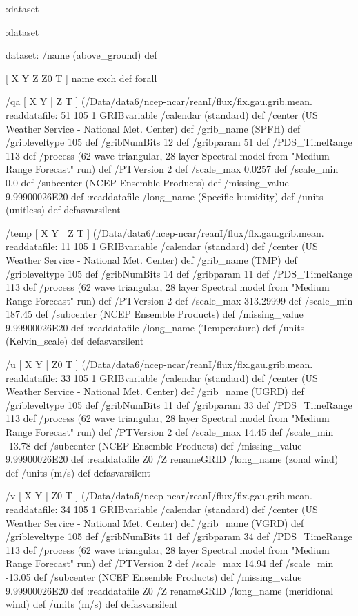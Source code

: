 \begin{ingrid}
  :dataset

 :dataset

 dataset: /name (above_ground) def

  [ X Y Z Z0 T ] { name exch def } forall

  /qa { [ X Y | Z T ] (/Data/data6/ncep-ncar/reanI/flux/flx.gau.grib.mean.%
  readdatafile:
  51 105 1 GRIBvariable
  /calendar (standard) def
  /center (US Weather Service - National Met. Center) def
  /grib_name (SPFH) def
  /gribleveltype 105 def
  /gribNumBits 12 def
  /gribparam 51 def
  /PDS_TimeRange 113 def
  /process (62 wave triangular, 28 layer Spectral model from "Medium Range Forecast" run) def
  /PTVersion 2 def
  /scale_max 0.0257 def
  /scale_min 0.0 def
  /subcenter (NCEP Ensemble Products) def
  /missing_value 9.99900026E20 def
  :readdatafile
  /long_name (Specific humidity) def
  /units (unitless) def
  } defasvarsilent

  /temp { [ X Y | Z T ] (/Data/data6/ncep-ncar/reanI/flux/flx.gau.grib.mean.%
  readdatafile:
  11 105 1 GRIBvariable
  /calendar (standard) def
  /center (US Weather Service - National Met. Center) def
  /grib_name (TMP) def
  /gribleveltype 105 def
  /gribNumBits 14 def
  /gribparam 11 def
  /PDS_TimeRange 113 def
  /process (62 wave triangular, 28 layer Spectral model from "Medium Range Forecast" run) def
  /PTVersion 2 def
  /scale_max 313.29999 def
  /scale_min 187.45 def
  /subcenter (NCEP Ensemble Products) def
  /missing_value 9.99900026E20 def
  :readdatafile
  /long_name (Temperature) def
  /units (Kelvin_scale) def
  } defasvarsilent

  /u { [ X Y | Z0 T ] (/Data/data6/ncep-ncar/reanI/flux/flx.gau.grib.mean.%
  readdatafile:
  33 105 1 GRIBvariable
  /calendar (standard) def
  /center (US Weather Service - National Met. Center) def
  /grib_name (UGRD) def
  /gribleveltype 105 def
  /gribNumBits 11 def
  /gribparam 33 def
  /PDS_TimeRange 113 def
  /process (62 wave triangular, 28 layer Spectral model from "Medium Range Forecast" run) def
  /PTVersion 2 def
  /scale_max 14.45 def
  /scale_min -13.78 def
  /subcenter (NCEP Ensemble Products) def
  /missing_value 9.99900026E20 def
  :readdatafile
  Z0 /Z renameGRID
  /long_name (zonal wind) def
  /units (m/s) def
  } defasvarsilent

  /v { [ X Y | Z0 T ] (/Data/data6/ncep-ncar/reanI/flux/flx.gau.grib.mean.%
  readdatafile:
  34 105 1 GRIBvariable
  /calendar (standard) def
  /center (US Weather Service - National Met. Center) def
  /grib_name (VGRD) def
  /gribleveltype 105 def
  /gribNumBits 11 def
  /gribparam 34 def
  /PDS_TimeRange 113 def
  /process (62 wave triangular, 28 layer Spectral model from "Medium Range Forecast" run) def
  /PTVersion 2 def
  /scale_max 14.94 def
  /scale_min -13.05 def
  /subcenter (NCEP Ensemble Products) def
  /missing_value 9.99900026E20 def
  :readdatafile
  Z0 /Z renameGRID
  /long_name (meridional wind) def
  /units (m/s) def
  } defasvarsilent


\end{ingrid}
